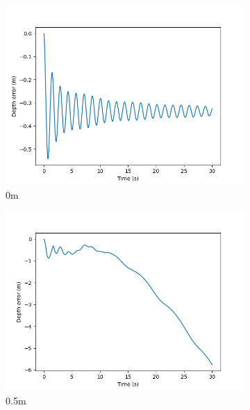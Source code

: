 \documentclass[class=article, crop=false]{standalone}
\begin{document}
\begin{figure}
    \centering
    \begin{subfigure}[b]{0.48\textwidth}
        \centering
        \includegraphics{scenario1/rov-100m/0.0m/rov_depth_error_uncontrolled}
        \caption{0m}
        \label{}
    \end{subfigure}
    \hfill
    \begin{subfigure}[b]{0.48\textwidth}
        \centering
        \includegraphics{scenario1/rov-100m/0.5m/rov_depth_error_uncontrolled}
        \caption{0.5m}
        \label{}
    \end{subfigure}
    \vfill
    \begin{subfigure}[b]{0.48\textwidth}
        \centering

\end{subfigure}
\end{figure}
\end{document}
